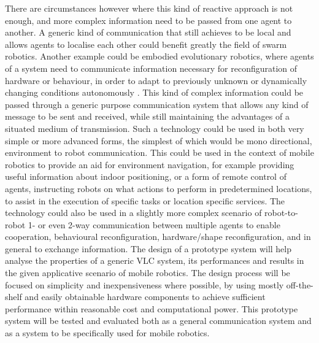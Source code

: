 There are circumstances however where this kind of reactive approach is not enough, and more complex information need to be passed from one agent to another.
A generic kind of communication that still achieves to be local and allows agents to localise each other could benefit greatly the field of swarm robotics.
Another example could be embodied evolutionary robotics, where agents of a system need to communicate information necessary for reconfiguration of hardware or behaviour, in order to adapt to previously unknown or dynamically changing conditions autonomously \cite{embodiedevolution}.
This kind of complex information could be passed through a generic purpose communication system that allows any kind of message to be sent and received, while still maintaining the advantages of a situated medium of transmission.
Such a technology could be used in both very simple or more advanced forms, the simplest of which would be mono directional, environment to robot communication.
This could be used in the context of mobile robotics to provide an aid for environment navigation, for example providing useful information about indoor positioning,
or a form of remote control of agents, instructing robots on what actions to perform in predetermined locations, to assist in the execution of specific tasks or location specific services. 
The technology could also be used in a slightly more complex scenario of robot-to-robot 1- or even 2-way communication between multiple agents to enable cooperation, behavioural reconfiguration, hardware/shape reconfiguration, and in general to exchange information.
\newline
The design of a prototype system will help analyse the properties of a generic VLC system, its performances and results in the given applicative scenario of mobile robotics.
The design process will be focused on simplicity and inexpensiveness where possible, by using mostly off-the-shelf and easily obtainable hardware components to achieve sufficient performance within reasonable cost and computational power.
This prototype system will be tested and evaluated both as a general communication system and as a system to be specifically used for mobile robotics.

